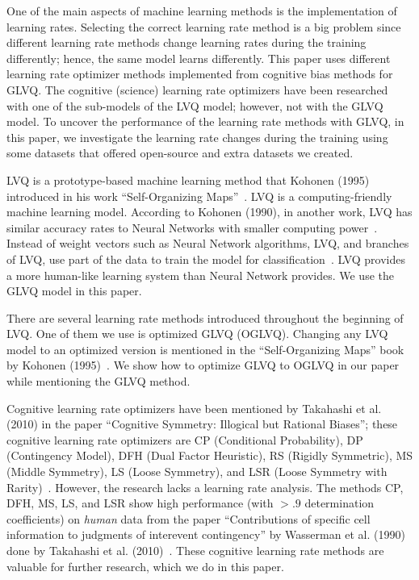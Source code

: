 One of the main aspects of machine learning methods is the implementation of learning rates. Selecting the correct learning rate method is a big problem since different learning rate methods change learning rates during the training differently; hence, the same model learns differently. This paper uses different learning rate optimizer methods implemented from cognitive bias methods for GLVQ. The cognitive (science) learning rate optimizers have been researched with one of the sub-models of the LVQ model; however, not with the GLVQ model. To uncover the performance of the learning rate methods with GLVQ, in this paper, we investigate the learning rate changes during the training using some datasets that offered open-source and extra datasets we created.

LVQ is a prototype-based machine learning method that Kohonen (1995) introduced in his work “Self-Organizing Maps”~\cite{kohonen1}. LVQ is a computing-friendly machine learning model. According to Kohonen (1990), in another work, LVQ has similar accuracy rates to Neural Networks with smaller computing power~\cite{kohonen2}. Instead of weight vectors such as Neural Network algorithms, LVQ, and branches of LVQ, use part of the data to train the model for classification~\cite{kohonen1}. LVQ provides a more human-like learning system than Neural Network provides. We use the GLVQ model in this paper.

There are several learning rate methods introduced throughout the beginning of LVQ. One of them we use is optimized GLVQ (OGLVQ). Changing any LVQ model to an optimized version is mentioned in the “Self-Organizing Maps” book by Kohonen (1995)~\cite{kohonen1}. We show how to optimize GLVQ to OGLVQ in our paper while mentioning the GLVQ method.

Cognitive learning rate optimizers have been mentioned by Takahashi et al. (2010) in the paper “Cognitive Symmetry: Illogical but Rational Biases”; these cognitive learning rate optimizers are CP (Conditional Probability), DP (Contingency Model), DFH (Dual Factor Heuristic), RS (Rigidly Symmetric), MS (Middle Symmetry), LS (Loose Symmetry), and LSR (Loose Symmetry with Rarity)~\cite{cogn,shinohara}. However, the research lacks a learning rate analysis. The methods CP, DFH, MS, LS, and LSR show high performance (with $>.9$ determination coefficients) on \textit{human} data from the paper “Contributions of specific cell information to judgments of interevent contingency” by Wasserman et al. (1990)~\cite{wasser} done by Takahashi et al. (2010)~\cite{cogn}. These cognitive learning rate methods are valuable for further research, which we do in this paper.

